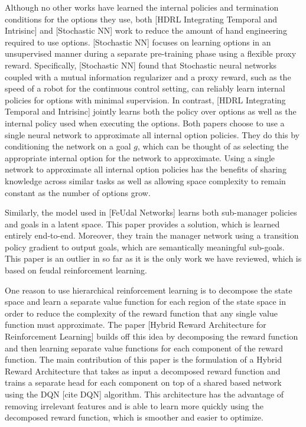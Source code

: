 Although no other works have learned the internal policies and termination conditions
for the options they use, both [HDRL Integrating Temporal and Intrisinc] and
[Stochastic NN] work to reduce the amount of hand engineering required
to use options. [Stochastic NN] focuses on learning options in an unsupervised manner
during a separate pre-training phase using a flexible proxy reward.
Specifically, [Stochastic NN] found that Stochastic neural networks coupled with
a mutual information regularizer and a proxy reward, such as the speed of a
robot for the continuous control setting, can reliably learn internal policies for
options with minimal supervision. In contrast,
[HDRL Integrating Temporal and Intrisinc] jointly learns both the policy over options
as well as the internal policy used when executing the options. Both papers choose to
use a single neural network to approximate all internal option policies. They do this
by conditioning the network on a goal $g$, which can be thought of as selecting the
appropriate internal option for the network to approximate. Using a single network
to approximate all internal option policies has the benefits of sharing knowledge
across similar tasks as well as allowing space complexity to remain constant as
the number of options grow.

Similarly, the model used in [FeUdal Networks] learns both sub-manager policies and
goals in a latent space. This paper provides a solution, which is learned entirely
end-to-end. Moreover, they train the manager network using a transition
policy gradient to output goals, which are semantically meaningful sub-goals.
This paper is an outlier in so far as it is the only work we have
reviewed, which is based on feudal reinforcement learning.

One reason to use hierarchical reinforcement learning is
to decompose the state space and learn a separate value function
for each region of the state space in order to reduce the complexity of the reward
function that any single value function must approximate. The paper
[Hybrid Reward Architecture for Reinforcement Learning] builds off this idea
by decomposing the reward function and then learning separate value functions for
each component of the reward function. The main contribution of this paper is
the formulation of a Hybrid Reward Architecture that takes as input a decomposed
reward function and trains a separate head for each component on top of a shared based
network using the DQN [cite DQN] algorithm. This architecture has the advantage of
removing irrelevant features and is able to learn more quickly using the decomposed
reward function, which is smoother and easier to optimize.

